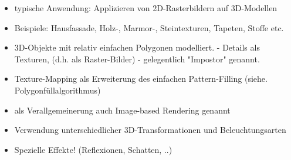 \documentclass[10pt,landscape]{article}
\makeatletter
\renewcommand{\section}{\@startsection{section}{1}{0mm}%
                                {-1ex plus -.5ex minus -.2ex}%
                                {0.5ex plus .2ex}%
                                {\normalfont\large\bfseries}}
\renewcommand{\subsection}{\@startsection{subsection}{2}{0mm}%
                                {-1explus -.5ex minus -.2ex}%
                                {0.5ex plus .2ex}%
                                {\normalfont\normalsize\bfseries}}
\makeatother
\begin{document}
\begin{multicols}{3}
{\begin{itemize}
  \subsection{ Zusammenfassung}
  \begin{itemize}
  \item BRDF für physikbasierte, lokale Berechnung der Reflexion von Lichtquellen als Funktion von Einfallswinkel und Betrachterwinkel (evtl. wellenlängenabhängig, oder einfach durch RGB) 
  \item Rendergleichung (Kajiya) = BRDF, Integral über alle Lichtquellen (bzw. Hemisphäre)
  \item für indirekte Beleuchtung / Global Illumination: (verschiedene algorithmische Verfahren unter Verwendung der lokalen Beleuchtung (BRDF)
  \item (rekursives) Raytracing (einfache Spiegelung, Brechung, Schatten)
  \item Monte Carlo RT, (gestreute Spiegelung, diffuse Reflexion), Backward Ray Tracing (Kaustik), Photon Mapping $\rightarrow$ jedoch extrem rechenaufwendig!)
  \item Radiosity (indirekte diffuse Reflexion - sichtunabhängige Voraus-berechnung in 3D für statische Szenen)
  \item verschiedene Verfahren können kombiniert werden um die globale Beleuchtungsphänomene effizienter zu berechnen. - z. B. Radiosity + Ray Tracing: Indirekte diffuse Beleuchtung + Spiegelung und Schatten, etc.
  \end{itemize}

  \item typische Anwendung: Applizieren von 2D-Rasterbildern auf 3D-Modellen
  \item Beispiele: Hausfassade, Holz-, Marmor-, Steintexturen, Tapeten, Stoffe etc.
  \item 3D-Objekte mit relativ einfachen Polygonen modelliert. - Details als Texturen, (d.h. als Raster-Bilder) - gelegentlich "Impostor" genannt.
  \item Texture-Mapping als Erweiterung des einfachen Pattern-Filling (siehe. Polygonfüllalgorithmus)
  \item als Verallgemeinerung auch Image-based Rendering genannt
  \item Verwendung unterschiedlicher 3D-Transformationen und Beleuchtungsarten
  \item Spezielle Effekte! (Reflexionen, Schatten, ..)
  

\end{itemize}}
\end{multicols}
\end{document}
